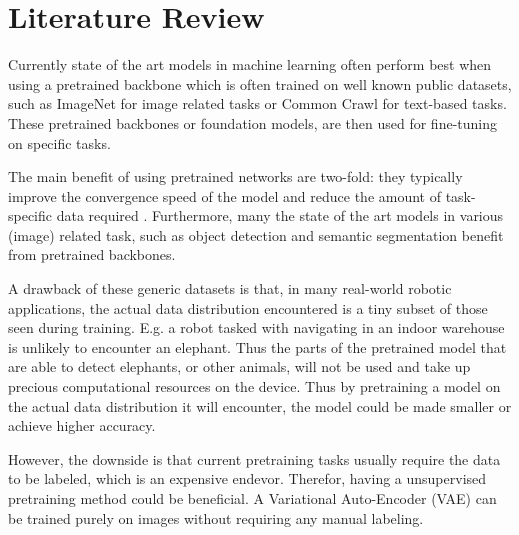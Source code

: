 \chapter{Literature Review}
Currently state of the art models in machine learning often perform best when using a pretrained backbone which is often trained on well known public datasets, such as ImageNet \cite{deng2009imagenet} for image related tasks or Common Crawl \cite{commoncrawl} for text-based tasks. These pretrained backbones or foundation models, are then used for fine-tuning on specific tasks.

The main benefit of using pretrained networks are two-fold: they typically improve the convergence speed of the model and reduce the amount of task-specific data required \cite{donahue2014decaf,zeiler2014visualizing}. Furthermore, many the state of the art models in various (image) related task, such as object detection\cite{liu2016ssd,redmon2016you} and semantic segmentation \cite{orsic2019defense,girshick2014rich} benefit from pretrained backbones.

A drawback of these generic datasets is that, in many real-world robotic applications, the actual data distribution encountered is a tiny subset of those seen during training. E.g. a robot tasked with navigating in an indoor warehouse is unlikely to encounter an elephant. Thus the parts of the pretrained model that are able to detect elephants, or other animals, will not be used and take up precious computational resources on the device. Thus by pretraining a model on the actual data distribution it will encounter, the model could be made smaller or achieve higher accuracy.

However, the downside is that current pretraining tasks usually require the data to be labeled, which is an expensive endevor. Therefor, having a unsupervised pretraining method could be beneficial. A Variational Auto-Encoder (VAE) can be trained purely on images without requiring any manual labeling.


